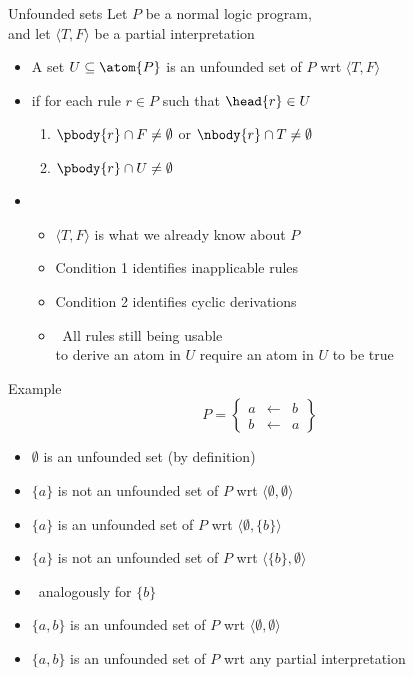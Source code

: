 \begin{frame}{Unfounded sets}
  Let $P$ be a normal logic program,\\ and
  let $\langle T,F \rangle$ be a partial interpretation
  \smallskip
  \begin{itemize}
  \item<2-> A set $U \subseteq \atom{P}$ is an \alert{unfounded set} of $P$
    wrt $\langle T,F \rangle$
  \item<4->[]
    if for each rule $r\in P$ such that $\head{r}\in U$

    \begin{enumerate}\normalsize
    \item<5-> $\pbody{r} \cap F \neq \emptyset$ or $\nbody{r} \cap T \neq \emptyset$
    \item<7-> $\pbody{r} \cap U \neq \emptyset$
    \end{enumerate}
    \medskip
  \item<3->  \
    \begin{itemize}\normalsize
    \item<3-> $\langle T,F \rangle$ is what we already know about $P$
    \item<6-> Condition 1 identifies inapplicable rules
    \item<8-> Condition 2 identifies cyclic derivations
      \smallskip
    \item<9->[]  \
    \alert{All rules still being usable\\ to derive an atom in $U$ require an atom in $U$ to be true}
  \end{itemize}
\end{itemize}
\nocite{gerosc91a}
\end{frame}
\begin{frame}{Example}
\[
P
=
\left\{
  \begin{array}{lcl}
    a &\leftarrow & b \\
    b &\leftarrow & a
  \end{array}
\right\}
\]
\medskip
\begin{itemize}
\item<2-> $\emptyset$ is an unfounded set (by definition)
\smallskip
\item<3-> $\{a\}$ is not an unfounded set of $P$ wrt $\langle\emptyset,\emptyset\rangle$
\item<4-> $\{a\}$ is     an unfounded set of $P$ wrt $\langle\emptyset,\{b\}\rangle$
\item<5-> $\{a\}$ is not an unfounded set of $P$ wrt $\langle\{b\},\emptyset\rangle$
\smallskip
\item<6>[]\itarrow\ analogously for $\{b\}$
\smallskip
\item<7-> $\{a,b\}$ is     an unfounded set of $P$ wrt $\langle\emptyset,\emptyset\rangle$
\item<8-> $\{a,b\}$ is     an unfounded set of $P$ wrt any partial interpretation
\end{itemize}

\end{frame}
